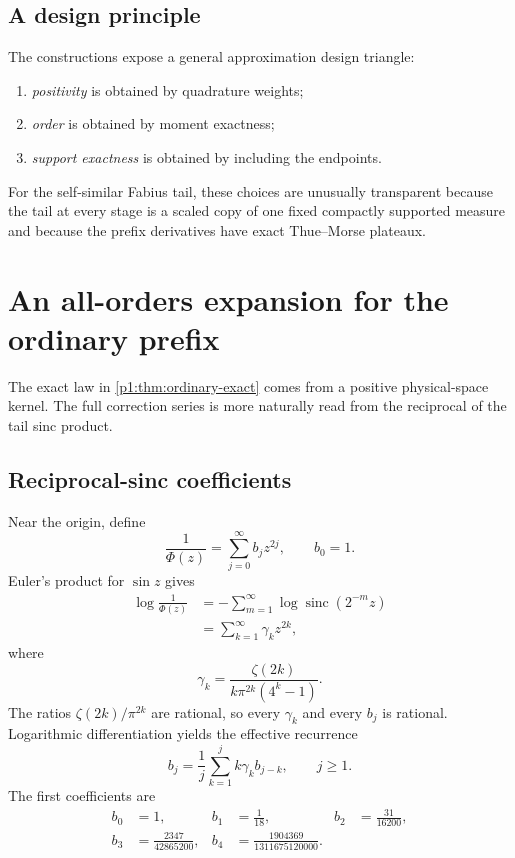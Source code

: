 \documentclass[11pt]{article}
\numberwithin{equation}{section}
\theoremstyle{definition}
\theoremstyle{remark}
\newcommand{\sinc}{\operatorname{sinc}}
\begin{document}
\subsection{A design principle}

The constructions expose a general approximation design triangle:
\begin{enumerate}
\item \emph{positivity} is obtained by quadrature weights;
\item \emph{order} is obtained by moment exactness;
\item \emph{support exactness} is obtained by including the endpoints.
\end{enumerate}
For the self-similar Fabius tail, these choices are unusually transparent because the tail at every stage is a scaled copy of one fixed compactly supported measure and because the prefix derivatives have exact Thue--Morse plateaux.

\section{An all-orders expansion for the ordinary prefix}
\label{p1:sec:reciprocal-sinc}

The exact law in \cref{p1:thm:ordinary-exact} comes from a positive physical-space kernel.  The full correction series is more naturally read from the reciprocal of the tail sinc product.

\subsection{Reciprocal-sinc coefficients}

Near the origin, define
\begin{equation}
 \frac1{\Phi(z)}=\sum_{j=0}^{\infty}b_jz^{2j},
 \qquad b_0=1.
 \label{p1:eq:B-reciprocal}
\end{equation}
Euler's product for $\sin z$ gives
\begin{align}
 \log\frac1{\Phi(z)}
 &=-\sum_{m=1}^{\infty}\log\sinc(2^{-m}z)\nonumber\\
 &=\sum_{k=1}^{\infty}\gamma_kz^{2k},
 \label{p1:eq:log-reciprocal-Phi}
\end{align}
where
\begin{equation}
 \boxed{
 \gamma_k=\frac{\zeta(2k)}{k\pi^{2k}(4^k-1)}.}
 \label{p1:eq:gamma-k}
\end{equation}
The ratios $\zeta(2k)/\pi^{2k}$ are rational, so every $\gamma_k$ and every $b_j$ is rational.  Logarithmic differentiation yields the effective recurrence
\begin{equation}
 \boxed{
 b_j=\frac1j\sum_{k=1}^{j}k\gamma_kb_{j-k},
 \qquad j\ge1.}
 \label{p1:eq:b-recurrence}
\end{equation}
The first coefficients are
\begin{align}
 b_0&=1,&
 b_1&=\frac1{18},&
 b_2&=\frac{31}{16200},\label{p1:eq:b-low-1}\\
 b_3&=\frac{2347}{42865200},&
 b_4&=\frac{1904369}{1311675120000}.\label{p1:eq:b-low-2}
\end{align}
\end{document}
